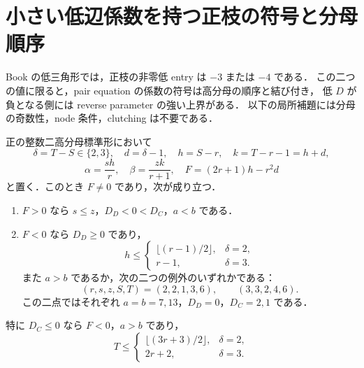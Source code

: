 \section{小さい低辺係数を持つ正枝の符号と分母順序}
\label{ps21:section}

Book の低三角形では，正枝の非零低 entry は $-3$ または $-4$ である．
この二つの値に限ると，pair equation の係数の符号は高分母の順序と結び付き，
低 $D$ が負となる側には reverse parameter の強い上界がある．
以下の局所補題には分母の奇数性，node 条件，clutching は不要である．

\begin{lemma}\label{ps21:positive-sector}
正の整数二高分母標準形において
\[
 \delta=T-S\in\{2,3\},\quad d=\delta-1,\quad
 h=S-r,\quad k=T-r-1=h+d,
\]
\[
 \alpha=\frac{sh}{r},\quad\beta=\frac{zk}{r+1},\quad
 F=(2r+1)h-r^2d
\]
と置く．このとき $F\ne0$ であり，次が成り立つ．
\begin{enumerate}
\item $F>0$ なら $s\le z$，$D_D<0<D_C$，$a<b$ である．
\item $F<0$ なら $D_D\ge0$ であり，
\begin{equation}\label{ps21:h-bound}
 h\le
 \begin{cases}
 \lfloor(r-1)/2\rfloor,&\delta=2,\\
 r-1,&\delta=3.
 \end{cases}
\end{equation}
また $a>b$ であるか，次の二つの例外のいずれかである：
\begin{equation}\label{ps21:equal-base-points}
 (r,s,z,S,T)=(2,2,1,3,6),\qquad (3,3,2,4,6).
\end{equation}
この二点ではそれぞれ $a=b=7,13$，$D_D=0$，$D_C=2,1$ である．
\end{enumerate}
特に $D_C\le0$ なら $F<0$，$a>b$ であり，
\begin{equation}\label{ps21:T-bound}
 T\le
 \begin{cases}
 \lfloor(3r+3)/2\rfloor,&\delta=2,\\
 2r+2,&\delta=3.
 \end{cases}
\end{equation}
\end{lemma}

